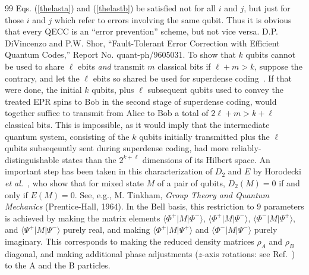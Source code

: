 \begin{thebibliography}{99}
Eqs. (\protect\ref{thelasta}) and (\protect\ref{thelastb})
be satisfied not for all $i$ and $j$, but just for those $i$ and $j$
which refer to errors involving the same qubit.  Thus it is obvious
that every QECC is an ``error prevention'' scheme, but not vice versa.
 D.P. DiVincenzo and P.W. Shor, ``Fault-Tolerant 
Error Correction with Efficient Quantum Codes,'' Report No. quant-ph/9605031.
 To show that $k$ qubits cannot be used
to share $\ell$ ebits {\em and\/} transmit $m$ classical bits
if \mbox{$\ell+m>k$}, suppose the contrary, and let the
$\ell$ ebits so shared be used for superdense coding~\protect\cite{superdense}.
If that were done, the initial $k$ qubits, plus $\ell$ subsequent qubits
used to convey the treated EPR spins to Bob in the second stage of
superdense coding, would together suffice to transmit from Alice to Bob
a total of $2\ell+m>k+\ell$ classical bits.  This is impossible, as it would
imply that the intermediate quantum system, consisting of the $k$ qubits
initially transmitted plus the $\ell$ qubits subseqeuntly sent during
superdense coding, had more reliably-distinguishable states than the 
$2^{k+\ell}$ dimensions of its Hilbert space.
An important step has been taken in this characterization
of $D_2$ and $E$ by Horodecki {\em et al.}~\protect\cite{horodecki2},
who show that for mixed state $M$ of a
pair of qubits, $D_2(M)=0$ if and only if $E(M)=0.$
 See, e.g., M. Tinkham, {\em Group Theory and
Quantum Mechanics} (Prentice-Hall, 1964).
In the Bell basis, this restriction to 9 parameters is
achieved by making the matrix elements
$\langle\Phi^+|M|\Phi^-\rangle$, $\langle\Phi^+|M|\Psi^-\rangle$,
$\langle\Phi^-|M|\Psi^+\rangle$, and $\langle\Psi^+|M|\Psi^-\rangle$
purely real, and making $\langle\Phi^+|M|\Psi^+\rangle$ and
$\langle\Phi^-|M|\Psi^-\rangle$ purely imaginary.  This corresponds to
making the reduced density matrices $\rho_A$ and $\rho_B$ diagonal,
and making additional phase adjustments ($z$-axis rotations: see
Ref.~\protect\cite{G9}) to the A and the B particles.
\end{thebibliography}
 

